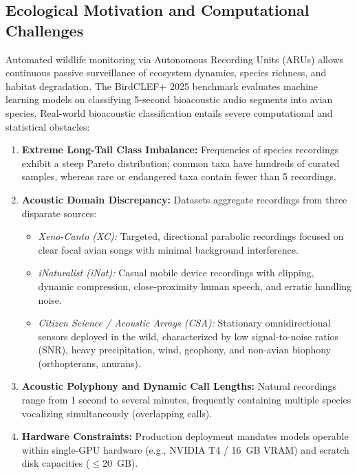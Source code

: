 \documentclass[11pt,a4paper]{article}
\begin{document}
\subsection{Ecological Motivation and Computational Challenges}
Automated wildlife monitoring via Autonomous Recording Units (ARUs) allows continuous passive surveillance of ecosystem dynamics, species richness, and habitat degradation. The BirdCLEF+ 2025 benchmark evaluates machine learning models on classifying 5-second bioacoustic audio segments into avian species. Real-world bioacoustic classification entails severe computational and statistical obstacles:
\begin{enumerate}[leftmargin=*]
    \item \textbf{Extreme Long-Tail Class Imbalance:} Frequencies of species recordings exhibit a steep Pareto distribution; common taxa have hundreds of curated samples, whereas rare or endangered taxa contain fewer than 5 recordings.
    \item \textbf{Acoustic Domain Discrepancy:} Datasets aggregate recordings from three disparate sources:
    \begin{itemize}[leftmargin=*]
        \item \textit{Xeno-Canto (XC):} Targeted, directional parabolic recordings focused on clear focal avian songs with minimal background interference.
        \item \textit{iNaturalist (iNat):} Casual mobile device recordings with clipping, dynamic compression, close-proximity human speech, and erratic handling noise.
        \item \textit{Citizen Science / Acoustic Arrays (CSA):} Stationary omnidirectional sensors deployed in the wild, characterized by low signal-to-noise ratios (SNR), heavy precipitation, wind, geophony, and non-avian biophony (orthopterans, anurans).
    \end{itemize}
    \item \textbf{Acoustic Polyphony and Dynamic Call Lengths:} Natural recordings range from 1 second to several minutes, frequently containing multiple species vocalizing simultaneously (overlapping calls).
    \item \textbf{Hardware Constraints:} Production deployment mandates models operable within single-GPU hardware (e.g., NVIDIA T4 / 16~GB VRAM) and scratch disk capacities ($\le 20$~GB).
\end{enumerate}
\end{document}
